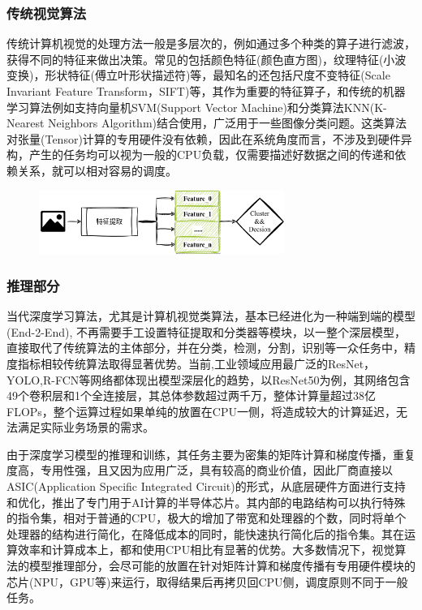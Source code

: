 \documentclass[master,anonymous]{shtthesis}
\begin{document}
\subsubsection{传统视觉算法}\label{传统视觉算法}
传统计算机视觉的处理方法一般是多层次的，例如通过多个种类的算子进行滤波，获得不同的特征来做出决策。常见的包括颜色特征(颜色直方图)，纹理特征(小波变换)，形状特征(傅立叶形状描述符)等，最知名的还包括尺度不变特征(Scale Invariant Feature Transform，SIFT\cite{ng2003sift})等，其作为重要的特征算子，和传统的机器学习算法例如支持向量机SVM(Support Vector Machine)和分类算法KNN(K-Nearest Neighbors Algorithm)结合使用，广泛用于一些图像分类问题。这类算法对张量(Tensor)计算的专用硬件没有依赖，因此在系统角度而言，不涉及到硬件异构，产生的任务均可以视为一般的CPU负载，仅需要描述好数据之间的传递和依赖关系，就可以相对容易的调度。

\begin{figure}[htbp]
	\centering
	\includegraphics[width=8cm]{img/trad_vis.png}
	\label{基于传统视觉算法的计算流程}
\end{figure}

\subsubsection{推理部分}\label{推理部分}
当代深度学习算法，尤其是计算机视觉类算法，基本已经进化为一种端到端的模型(End-2-End), 不再需要手工设置特征提取和分类器等模块，以一整个深层模型，直接取代了传统算法的主体部分，并在分类，检测，分割，识别等一众任务中，精度指标相较传统算法取得显著优势。当前,工业领域应用最广泛的ResNet，YOLO,R-FCN等网络都体现出模型深层化的趋势，以ResNet50\cite{he2016deep}为例，其网络包含49个卷积层和1个全连接层，其总体参数超过两千万，整体计算量超过38亿FLOPs，整个运算过程如果单纯的放置在CPU一侧，将造成较大的计算延迟，无法满足实际业务场景的需求。

由于深度学习模型的推理和训练，其任务主要为密集的矩阵计算和梯度传播，重复度高，专用性强，且又因为应用广泛，具有较高的商业价值，因此厂商直接以ASIC(Application Specific Integrated Circuit)的形式，从底层硬件方面进行支持和优化，推出了专门用于AI计算的半导体芯片。其内部的电路结构可以执行特殊的指令集，相对于普通的CPU，极大的增加了带宽和处理器的个数，同时将单个处理器的结构进行简化，在降低成本的同时，能快速执行简化后的指令集。其在运算效率和计算成本上，都和使用CPU相比有显著的优势。大多数情况下，视觉算法的模型推理部分，会尽可能的放置在针对矩阵计算和梯度传播有专用硬件模块的芯片(NPU，GPU等)来运行，取得结果后再拷贝回CPU侧，调度原则不同于一般任务。
\end{document}
